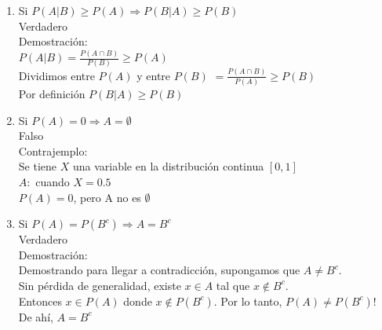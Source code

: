 \documentclass[12pt,a4paper]{report}
\begin{document}
\begin{enumerate}
{\begin{enumerate}[label=\alph*) ]
{	Verdadero\\
	
	Demostración:\\
	Sabemos que $P(A|B) \subseteq$ P(A), ya que $(A \cap B) \subseteq A$\\
	Usando el teorema visto en clase: 
	(Si $A, B \in F$ tal que $A \subseteq B \Rightarrow P(A) \leq P(B)$)\\
	Tenemos que $P(A|B) \leq P(A)$\\

	}

	\item{Si $P(A|B) \geq P(A) \Rightarrow P(B|A)\geq P(B)$\\
	
	Verdadero\\
	
	Demostración:\\
	$P(A|B) = \frac{P(A \cap B)}{P(B)} \geq P(A)$\\
	Dividimos entre $P(A)$ y entre $P(B)$
	$ = \frac{P(A \cap B)}{P(A)} \geq P(B)$ \\
	Por definición
	$P(B|A) \geq P(B)$\\

	}

	\item{Si $P(A)=0 \Rightarrow A= \emptyset$ \\

	Falso\\
	
	Contrajemplo:\\
	Se tiene $X$ una variable en la distribución continua $[0,1]$\\
	$A:$ cuando $X = 0.5$\\
	$P(A)=0$, pero A no es $\emptyset$\\
	}
	
	\item{Si $P(A)=P(B^c) \Rightarrow A=B^c$}\\
	
	Verdadero\\
	
	Demostración:\\
	Demostrando para llegar a contradicción, supongamos que $A \neq B^c$.\\
	Sin pérdida de generalidad, existe $x \in A$ tal que $x \not\in B^c$.\\ 
	Entonces ${x} \in P(A)$ donde ${x} \not\in P(B^c)$. Por lo tanto, $P(A) \neq P(B^c)$!\\
	De ahí, $A = B^c$\\
	

\end{enumerate}}
\end{enumerate}
\end{document}
